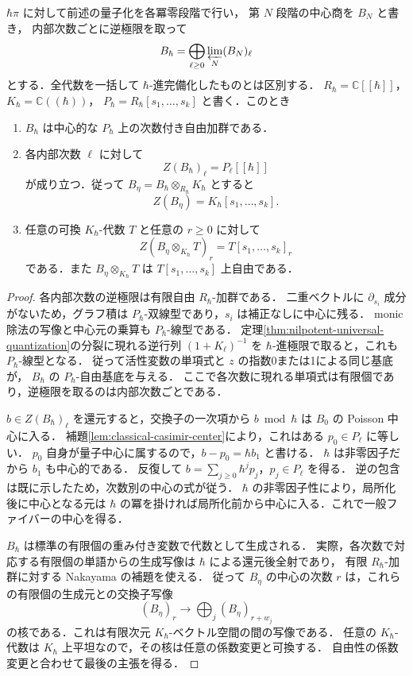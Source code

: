 \begin{theorem}[形式一般ファイバーの普遍中心条件]
\label{thm:formal-generic-center}
$\hbar\pi$ に対して前述の量子化を各冪零段階で行い，
第 $N$ 段階の中心商を $B_N$ と書き，
内部次数ごとに逆極限を取って
\[
 B_\hbar=\bigoplus_{\ell\ge0}\varprojlim_N(B_N)_\ell
\]
とする．全代数を一括して $\hbar$-進完備化したものとは区別する．
$R_\hbar=\mathbb C[[\hbar]]$，$K_\hbar=\mathbb C((\hbar))$，
$P_\hbar=R_\hbar[s_1,\ldots,s_k]$ と書く．このとき
\begin{enumerate}
\item $B_\hbar$ は中心的な $P_\hbar$ 上の次数付き自由加群である．
\item 各内部次数 $\ell$ に対して
\[
 Z(B_\hbar)_\ell=P_\ell[[\hbar]]
\]
が成り立つ．従って $B_\eta=B_\hbar\otimes_{R_\hbar}K_\hbar$ とすると
\[
 Z(B_\eta)=K_\hbar[s_1,\ldots,s_k].
\]
\item 任意の可換 $K_\hbar$-代数 $T$ と任意の $r\ge0$ に対して
\[
 Z(B_\eta\otimes_{K_\hbar}T)_r
   =T[s_1,\ldots,s_k]_r
\]
である．また $B_\eta\otimes_{K_\hbar}T$ は $T[s_1,\ldots,s_k]$ 上自由である．
\end{enumerate}
\end{theorem}
\begin{proof}
各内部次数の逆極限は有限自由 $R_\hbar$-加群である．
二重ベクトルに $\partial_{s_i}$ 成分がないため，グラフ積は
$P_\hbar$-双線型であり，$s_i$ は補正なしに中心に残る．
monic 除法の写像と中心元の乗算も $P_\hbar$-線型である．
定理\ref{thm:nilpotent-universal-quantization}の分裂に現れる逆行列
$(1+K_\ell)^{-1}$ を $\hbar$-進極限で取ると，これも $P_\hbar$-線型となる．
従って活性変数の単項式と $z$ の指数0または1による同じ基底が，
$B_\hbar$ の $P_\hbar$-自由基底を与える．
ここで各次数に現れる単項式は有限個であり，逆極限を取るのは内部次数ごとである．

$b\in Z(B_\hbar)_\ell$ を還元すると，交換子の一次項から
$b\bmod\hbar$ は $B_0$ の Poisson 中心に入る．
補題\ref{lem:classical-casimir-center}により，これはある $p_0\in P_\ell$ に等しい．
$p_0$ 自身が量子中心に属するので，$b-p_0=\hbar b_1$ と書ける．
$\hbar$ は非零因子だから $b_1$ も中心的である．
反復して $b=\sum_{j\ge0}\hbar^jp_j$，$p_j\in P_\ell$ を得る．
逆の包含は既に示したため，次数別の中心の式が従う．
$\hbar$ の非零因子性により，局所化後に中心となる元は
$\hbar$ の冪を掛ければ局所化前から中心に入る．これで一般ファイバーの中心を得る．

$B_\hbar$ は標準の有限個の重み付き変数で代数として生成される．
実際，各次数で対応する有限個の単語からの生成写像は $\hbar$ による還元後全射であり，
有限 $R_\hbar$-加群に対する Nakayama の補題を使える．
従って $B_\eta$ の中心の次数 $r$ は，これらの有限個の生成元との交換子写像
\[
 (B_\eta)_r\longrightarrow\bigoplus_j(B_\eta)_{r+w_j}
\]
の核である．これは有限次元 $K_\hbar$-ベクトル空間の間の写像である．
任意の $K_\hbar$-代数は $K_\hbar$ 上平坦なので，その核は任意の係数変更と可換する．
自由性の係数変更と合わせて最後の主張を得る．
\end{proof}

